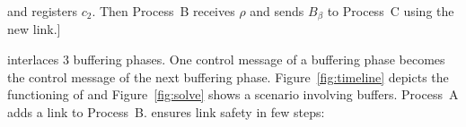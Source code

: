 \begin{figure*}
\begin{center}
    and registers $c_2$. Then Process~B receives $\rho$ and sends $B_\beta$ to
    Process~C using the new link.]
    {}
    \hspace{10pt}
    \\
    \caption{\label{fig:solve}Using buffers and control messages, \RPCBROADCAST 
      provides reliable causal broadcast.}
  \end{center}
\end{figure*}



\RPCBROADCAST interlaces 3 buffering phases. One control message of a buffering
phase becomes the control message of the next buffering
phase. Figure~\ref{fig:timeline} depicts the functioning of \RPCBROADCAST and
Figure~\ref{fig:solve} shows a scenario involving buffers.  Process~A adds a link to
Process~B. \RPCBROADCAST ensures link safety in few steps:

